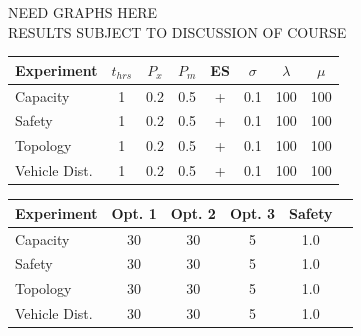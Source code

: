 NEED GRAPHS HERE\\
RESULTS SUBJECT TO DISCUSSION OF COURSE\\
\begin{tabular}{l*{7}{c}}
  \hline \hline
  Experiment & $t_{hrs}$ & $P_x$ & $P_m$ & ES & $\sigma$ & $\lambda$ & $\mu$ \\
  \hline
  Capacity & 1 & 0.2 & 0.5 & + & 0.1 & 100 & 100 \\
  Safety & 1 & 0.2 & 0.5 & + & 0.1 & 100 & 100 \\
  Topology & 1 & 0.2 & 0.5 & + & 0.1 & 100 & 100 \\
  Vehicle Dist. & 1 & 0.2 & 0.5 & + & 0.1 & 100 & 100  \\
  \hline
\end{tabular}

\begin{tabular}{l*{5}{c}}
  \hline \hline
  Experiment & Opt. 1 & Opt. 2 & Opt. 3 & Safety \\
  \hline
  Capacity & 30 & 30 & 5 & 1.0 \\
  Safety & 30 & 30 & 5 & 1.0 \\
  Topology & 30 & 30 & 5 & 1.0 \\
  Vehicle Dist. & 30 & 30 & 5 & 1.0 \\
  \hline
\end{tabular}
